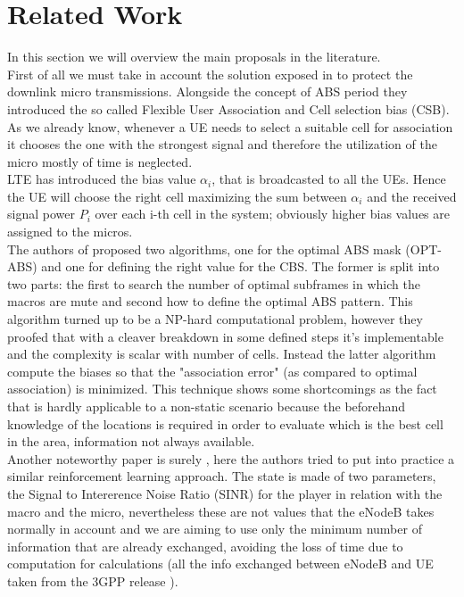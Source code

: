 \documentclass[conference,10pt]{IEEEtran}
\begin{document}
\section{Related Work}\label{sec:sota}
In this section we will overview the main proposals in the literature.\\
First of all we must take in account the solution exposed in \cite{deb2014algorithms} to protect the downlink micro transmissions. Alongside the concept of ABS period they introduced the so called Flexible User Association and Cell selection bias (CSB). As we already know, whenever a UE needs to select a suitable cell for association it chooses the one with the strongest signal and therefore the utilization of the micro mostly of time is neglected.\\
LTE has introduced the bias value $\alpha_i$, that is broadcasted to all the UEs. Hence the UE will choose the right cell maximizing the sum between $\alpha_i$ and the received signal power $P_i$ over each i-th cell in the system; obviously higher bias values are assigned to the micros.\\
The authors of \cite{deb2014algorithms} proposed two algorithms, one for the optimal ABS mask (OPT-ABS) and one for defining the right value for the CBS. The former is split into two parts: the first to search the number of optimal subframes in which the macros are mute and second how to define the optimal ABS pattern. This algorithm turned up to be a NP-hard computational problem, however they proofed that with a cleaver breakdown in some defined steps it's implementable and the complexity is scalar with number of cells. Instead the latter algorithm compute the biases so that the "association error" (as compared to optimal association) is minimized. This technique shows some shortcomings as the fact that is hardly applicable to a non-static scenario because the beforehand knowledge of the locations is required in order to evaluate which is the best cell in the area, information not always available.\\
Another noteworthy paper is surely \cite{simsek2013enhanced}, here the authors tried to put into practice a similar reinforcement learning approach. The state is made of two parameters, the Signal to Intererence Noise Ratio (SINR) for the player in relation with the macro and the micro, nevertheless these are not values that the eNodeB takes normally in account and we are aiming to use only the minimum number of information that are already exchanged, avoiding the loss of time due to computation for calculations (all the info exchanged between eNodeB and UE taken from the 3GPP release \cite{etsi2017136}). 
\end{document}
